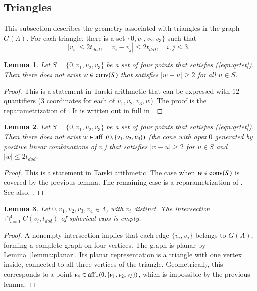\documentclass{article} %
\newtheorem{lemma}{Lemma}[subsection]
\begin{document}
\subsection{Triangles}

This subsection describes the geometry associated with
triangles in the graph $G(\Lambda)$.  For each triangle,
there is a set $\{0,v_1,v_2,v_3\}$ such that
\begin{equation}\label{eqn:qrtet}
  |v_i| \le 2t_{dod},\quad |v_i-v_j | \le 2 t_{dod},\quad i,j\le 3.
\end{equation}

\begin{lemma} Let $S=\{0,v_1,v_2,v_3\}$ be a set of four points
that satisfies (\ref{eqn:qrtet}).  Then
there does not exist $w\in{\operatorname{conv}}(S)$
that satisfies $|w-u|\ge 2$ for all
$u\in S$.
\end{lemma}

\begin{proof} This is a statement in Tarski arithmetic that can be
expressed with $12$ quantifiers ($3$ coordinates for each of
$v_1,v_2,v_3,w$). The proof is the reparametrization of
\cite[Lemma~4.15]{Hales:2006:DCG}. It is written out in full in
\cite[Lemma~3.3]{Hales:2002:Dodec}.
\end{proof}

\begin{lemma}\label{lemma:enclosed} 
Let $S=\{0,v_1,v_2,v_3\}$ be a set of four points
that satisfies (\ref{eqn:qrtet}).  Then
there does not exist $w\in{\operatorname{aff}}_+(0,\{v_1,v_2,v_3\})$
(the cone with apex $0$ 
generated by positive linear combinations of $v_i$) 
that satisfies $|w-u|\ge 2$ for 
$u\in S$ and $|w|\le 2t_{dod}$.
\end{lemma}

\begin{proof} This is a statement in Tarski arithmetic. The case when
$w\in{\operatorname{conv}}(S)$ is covered by the previous lemma. The remaining
case is a reparametrization of \cite[Lemma~4.19]{Hales:2006:DCG}. See
also, \cite[Cor~3.7]{Hales:2002:Dodec}.
\end{proof}

\begin{lemma}\label{lemma:4fold}  
Let $0,v_1,v_2,v_3,v_4\in\Lambda$, with
$v_i$ distinct.  The intersection $\cap_{i=1}^4 C(v_i,t_{dod})$
of spherical caps is empty.
\end{lemma}

\begin{proof}  A nonempty intersection implies that each
edge $\{v_i,v_j\}$ belongs to  $G(\Lambda)$, forming a complete graph
on four vertices.  The graph is planar by Lemma~\ref{lemma:planar}.
Its planar representation is a triangle with one vertex inside,
connected to all three vertices of the triangle.
Geometrically, this corresponds to a point $v_4\in{\operatorname{aff}}_+(0,\{v_1,v_2,v_3\})$, which is impossible by the previous lemma.
\end{proof}
\end{document}
